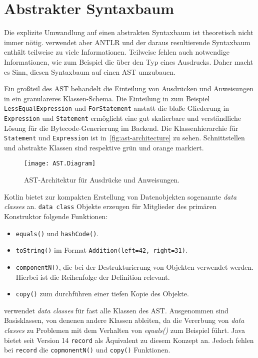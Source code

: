 \section{Abstrakter Syntaxbaum}

Die explizite Umwandlung auf einen abstrakten Syntaxbaum ist theoretisch nicht immer nötig. \Toya verwendet aber ANTLR und der daraus resultierende Syntaxbaum enthält teilweise zu viele Informationen. Teilweise fehlen auch notwendige Informationen, wie zum Beispiel die über den Typ eines Ausdrucks. Daher macht es Sinn, diesen Syntaxbaum auf einen AST umzubauen.

Ein großteil des AST behandelt die Einteilung von Ausdrücken und Anweisungen in ein granulareres Klassen-Schema. Die Einteilung in zum Beispiel \texttt{LessEqualExpression} und \texttt{ForStatement} anstatt die bloße Gliederung in \texttt{Expression} und \texttt{Statement} ermöglicht eine gut skalierbare und verständliche Lösung für die Bytecode-Generierung im Backend. Die Klassenhierarchie für \texttt{Statement} und \texttt{Expression} ist in~\autoref{fig:ast-architecture} zu sehen. Schnittstellen und abstrakte Klassen sind respektive grün und orange markiert.

\begin{figure}[h]
    \caption{AST-Architektur für Ausdrücke und Anweisungen.}
    \centering
    \texttt{[image: AST.Diagram]}
    \label{fig:ast-architecture}
\end{figure}

Kotlin bietet zur kompakten Erstellung von Datenobjekten sogenannte \textit{data classes} an. \texttt{data class} Objekte erzeugen für Mitglieder des primären Konstruktor folgende Funktionen:

\begin{itemize}
    \item \texttt{equals()} und \texttt{hashCode()}.
    \item \texttt{toString()} im Format \texttt{Addition(left=42, right=31)}.
    \item \texttt{componentN()}, die bei der Destrukturierung von Objekten verwendet werden. Hierbei ist die Reihenfolge der Definition relevant.
    \item \texttt{copy()} zum durchführen einer tiefen Kopie des Objekte.
\end{itemize}

\Toya verwendet \textit{data classes} für fast alle Klassen des AST. Ausgenommen sind Basisklassen, von denenen andere Klassen ableiten, da die Vererbung von \textit{data classes} zu Problemen mit dem Verhalten von \textit{equals()} zum Beispiel führt. Java bietet seit Version 14 \texttt{record} als Äquivalent zu diesem Konzept an. Jedoch fehlen bei \texttt{record} die \texttt{copmonentN()} und \texttt{copy()} Funktionen.

